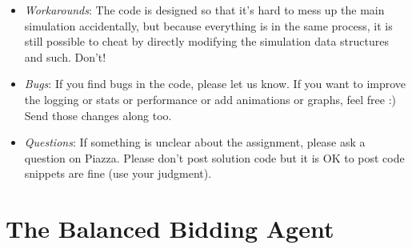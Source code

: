 \documentclass[11pt]{article}
\begin{document}
\begin{description}
\begin{itemize}
\item {\em Workarounds}: The code is designed so that it's hard to mess up the main simulation accidentally, but because everything is in the same process, it is still possible to cheat by directly modifying the simulation data structures and such. Don't!
%
		\item {\em Bugs}: If you find bugs in the code,
please let us know. If you want to improve the logging or stats or performance or add animations or graphs, feel free :) Send those changes along too.
%
    		\item {\em Questions}:
If something is unclear about the assignment, please ask a question on Piazza. Please don't post solution code but it is OK
to post code snippets are fine (use your judgment).
    	\end{itemize}
	\end{description}
	

\section{The Balanced Bidding Agent}
\end{document}
